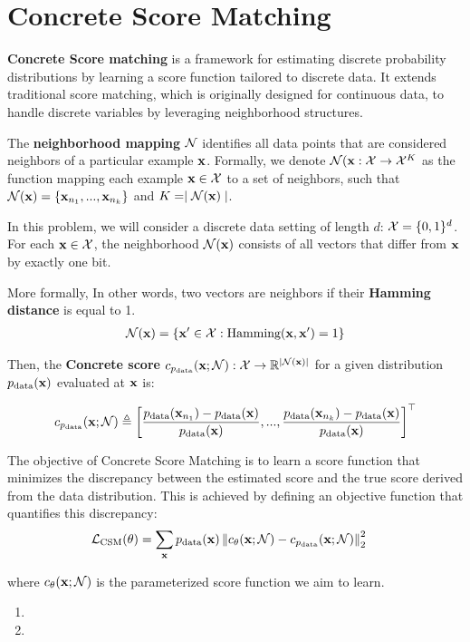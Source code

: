 \section{Concrete Score Matching}

\textbf{Concrete Score matching} is a framework for estimating discrete probability distributions by learning a score function tailored to discrete data. 
It extends traditional score matching, which is originally designed for continuous data, to handle discrete variables by leveraging neighborhood structures.

The \textbf{neighborhood mapping} $\mathcal{N}$ identifies all data points that are considered neighbors of a particular example $\mathbf{x}$. 
Formally, we denote $\mathcal{N}(\mathbf{x} : \mathcal{X} \rightarrow \mathcal{X}^{K}$ as the function mapping each example 
$\mathbf{x} \in \mathcal{X}$ to a set of neighbors, such that $\mathcal{N}(\mathbf{x}) = \{ \mathbf{x}_{n_1},...,\mathbf{x}_{n_k}\}$ 
and $K = \mid \mathcal{N}(\mathbf{x}) \mid$.

In this problem, we will consider a discrete data setting of length $d$: $\mathcal{X} = \{0,1\}^d$. For each $\mathbf{x} \in \mathcal{X}$, 
the neighborhood $\mathcal{N}(\mathbf{x})$ consists of all vectors that differ from $\mathbf{x}$ by exactly one bit. 

More formally, In other words, two vectors are neighbors if their \textbf{Hamming distance} is equal to 1.
\begin{align}
\mathcal{N}(\mathbf{x}) = \{\mathbf{x'} \in \mathcal{X} : \text{Hamming}(\mathbf{x},\mathbf{x'}) = 1\}
\end{align}

Then, the \textbf{Concrete score}
$c_{p_{\text{data}}}(\mathbf{x};\mathcal{N}) : \mathcal{X} \rightarrow \mathbb{R}^{\mid \mathcal{N}(\mathbf{x}) \mid}$ for a given distribution $p_{\text{data}}(\mathbf{x})$ evaluated at $\mathbf{x}$ is:

\begin{align}
    c_{p_{\text{data}}}(\mathbf{x}; \mathcal{N}) \triangleq \left[ \frac{p_{\text{data}}(\mathbf{x}_{n_1}) - p_{\text{data}}(\mathbf{x})}{p_{\text{data}}(\mathbf{x})},...,\frac{p_{\text{data}}(\mathbf{x}_{n_k})-p_{\text{data}}(\mathbf{x})}{p_{\text{data}}(\mathbf{x})} \right]^{\top}
\end{align}

The objective of Concrete Score Matching is to learn a score function that minimizes the discrepancy between the estimated score and the true score derived from the data distribution. This is achieved by defining an objective function that quantifies this discrepancy:
\begin{align}
    \mathcal{L_{\text{CSM}}}(\theta) &= \sum_{\mathbf{x}} p_{\text{data}}(\mathbf{x}) \left\| c_{\theta}(\mathbf{x}; \mathcal{N}) -c_{p_{\text{data}}}(\mathbf{x}; \mathcal{N}) \right\|^2_2 
\end{align}

where \( c_{\theta}(\mathbf{x}; \mathcal{N}) \) is the parameterized score function we aim to learn.

\begin{enumerate}[label=(\alph*)]
    \item 

    \item 
\end{enumerate}